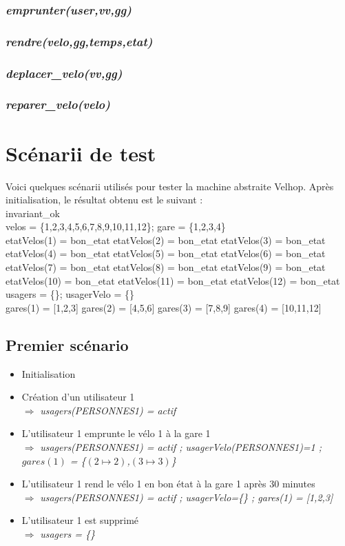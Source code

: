 \documentclass[12pt]{article}
\begin{document}
\subsubsection{\textit{emprunter(user,vv,gg)}}
\subsubsection{\textit{rendre(velo,gg,temps,etat)}}
\subsubsection{\textit{deplacer\_velo(vv,gg)}}
\subsubsection{\textit{reparer\_velo(velo)}}
\newpage
\section{Scénarii de test}
Voici quelques scénarii utilisés pour tester la machine abstraite Velhop. Après initialisation, le résultat obtenu est le suivant : \\
invariant\_ok \\
velos = \{1,2,3,4,5,6,7,8,9,10,11,12\};
gare = \{1,2,3,4\} \\
etatVelos(1) = bon\_etat
etatVelos(2) = bon\_etat
etatVelos(3) = bon\_etat
etatVelos(4) = bon\_etat
etatVelos(5) = bon\_etat
etatVelos(6) = bon\_etat
etatVelos(7) = bon\_etat
etatVelos(8) = bon\_etat
etatVelos(9) = bon\_etat
etatVelos(10) = bon\_etat
etatVelos(11) = bon\_etat
etatVelos(12) = bon\_etat \\
usagers = \{\};
usagerVelo = \{\} \\
gares(1) = [1,2,3]
gares(2) = [4,5,6]
gares(3) = [7,8,9]
gares(4) = [10,11,12]
\subsection{Premier scénario}
\begin{itemize}
  \item Initialisation
  \item Création d'un utilisateur 1 \\
  $\Rightarrow$ \textit{usagers(PERSONNES1) = actif}
  \item L'utilisateur 1 emprunte le vélo 1 à la gare 1 \\
  $\Rightarrow$ \textit{usagers(PERSONNES1) = actif ; usagerVelo(PERSONNES1)=1 ; $gares(1)$ = \{$(2\mapsto2)$,$(3\mapsto3)$\}}
  \item L'utilisateur 1 rend le vélo 1 en bon état à la gare 1 après 30 minutes \\
  $\Rightarrow$ \textit{usagers(PERSONNES1) = actif ; usagerVelo=\{\} ; gares(1) = [1,2,3]}
  \item L'utilisateur 1 est supprimé \\
  $\Rightarrow$ \textit{usagers = \{\}}
\end{itemize}
\end{document}
